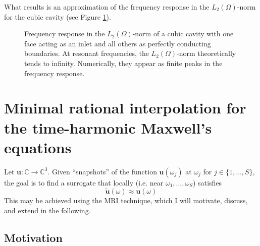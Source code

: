 \documentclass[11pt, a4paper]{article}
\begin{document}
What results is an approximation of the frequency response in the $L_2(\Omega)$-norm
for the cubic cavity (see Figure \ref{fig:fenics-demonstration}). 
\begin{figure}[h]
    \centering
    
    \caption{Frequency response in the $L_2(\Omega)$-norm of a cubic cavity with
    one face acting as an inlet and all others as perfectly conducting boundaries.
    At resonant frequencies, the $L_2(\Omega)$-norm theoretically tends to infinity.
    Numerically, they appear as finite peaks in the frequency response.}
    \label{fig:fenics-demonstration}
\end{figure}

\newpage
\section{Minimal rational interpolation for the time-harmonic Maxwell's equations}
\label{sec:mri}

Let $\mathbf{u} : \mathbb{C} \to \mathbb{C}^3$. Given \enquote{snapshots} of the
function $\mathbf{u}(\omega_j)$ at $\omega_j$ for $j \in \{1, \dots, S\}$, the
goal is to find a surrogate that locally (i.e. near $\omega_1, \dots, \omega_S$)
satisfies
\begin{equation}
    \mathbf{\tilde{u}}(\omega) \approx \mathbf{u}(\omega)
\end{equation}
This may be achieved using the \acrfull{MRI} technique, which I will motivate,
discuss, and extend in the following.

\subsection{Motivation}
\label{subsec:motivation}
\end{document}
